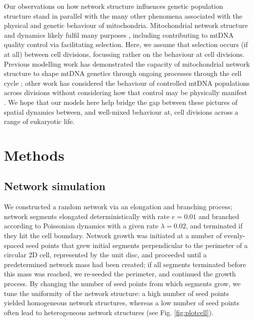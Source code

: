 \documentclass{article}
\begin{document}
Our observations on how network structure influences genetic population structure stand in parallel with the many other phenomena associated with the physical and genetic behaviour of mitochondria. Mitochondrial network structure and dynamics likely fulfil many purposes \citep{hoitzing2015function}, including contributing to mtDNA quality control \citep{twig2008mitochondrial, twig2008fission} via facilitating selection. Here, we assume that selection occurs (if at all) between cell divisions, focussing rather on the behaviour at cell divisions. Previous modelling work has demonstrated the capacity of mitochondrial network structure to shape mtDNA genetics through ongoing processes through the cell cycle \citep{aryaman2019mitochondrial, edwards2021avoiding}; other work has considered the behaviour of controlled mtDNA populations across divisions without considering how that control may be physically manifest \citep{johnston2015closed, johnston2016evolution}. We hope that our models here help bridge the gap between these pictures of spatial dynamics between, and well-mixed behaviour at, cell divisions across a range of eukaryotic life.
 
\section{Methods}
\subsection*{Network simulation}

We constructed a random network via an elongation and branching process; network segments elongated deterministically with rate $e = 0.01$ and branched according to Poissonian dynamics with a given rate $\lambda=0.02$, and terminated if they hit the cell boundary. Network growth was initiated at a number of evenly-spaced seed points that grew initial segments perpendicular to the perimeter of a circular 2D cell, represented by the unit disc, and proceeded until a predetermined network mass had been created; if all segments terminated before this mass was reached, we re-seeded the perimeter, and continued the growth process. By changing the number of seed points from which segments grow, we tune the uniformity of the network structure: a high number of seed points yielded homogeneous network structures, whereas a low number of seed points often lead to heterogeneous network structures (see Fig. \ref{fig:plotcell}).
\end{document}
